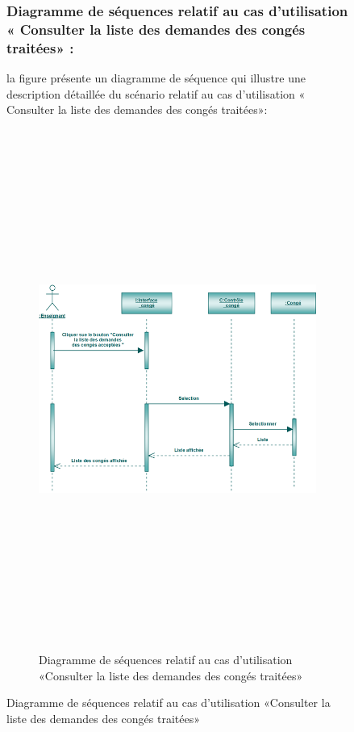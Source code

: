 \documentclass[12 pt]{report}
\begin{document}
\begin{figure}[h]
\begin{center}
\subsubsection{Diagramme de séquences relatif au cas d’utilisation « Consulter la liste des demandes
 des congés traitées» :}
la figure   présente un diagramme de séquence qui illustre une description détaillée du scénario relatif au cas d’utilisation « Consulter la liste des demandes
 des congés traitées»: 
\begin{figure}[h]
 \begin{center}
\includegraphics[width= 18 cm ,height=  17cm]{scct.PNG}
\caption{Diagramme de séquences relatif au cas d’utilisation «Consulter la liste des demandes
 des congés traitées»}

\end{center}
\end{figure}

\end{center}
\end{figure}
\end{document}
